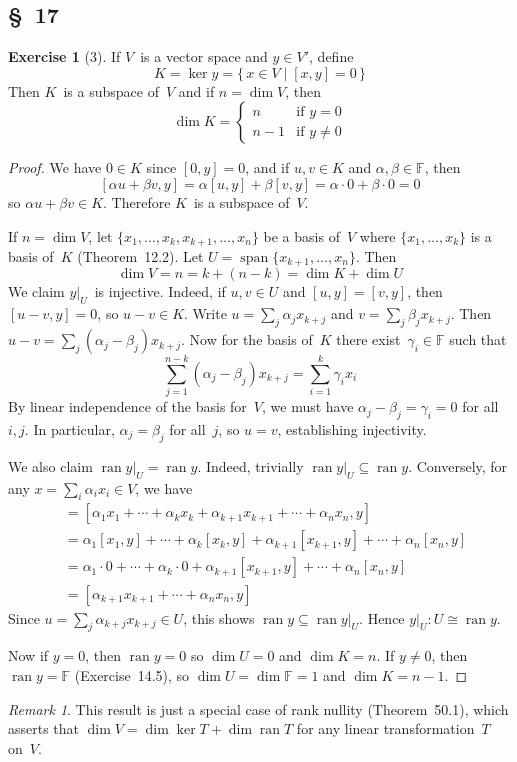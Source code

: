 \documentclass[letterpaper,12pt]{article}
\newcommand{\F}{\mathbb{F}}
\newcommand{\iso}{\cong}
\DeclareMathOperator{\ran}{ran}
\DeclareMathOperator{\spn}{span}
\newcommand{\restrict}[2]{{#1}|_{#2}}
\theoremstyle{definition}
\newtheorem*{exer}{Exercise}
\theoremstyle{remark}
\newtheorem*{rmk}{Remark}
\theoremstyle{direction}
\begin{document}
\subsection*{\S~17}
\begin{exer}[3]
If \(V\)~is a vector space and \(y\in V'\), define
\[K=\ker y=\{\,x\in V\mid [x,y]=0\,\}\]
Then \(K\)~is a subspace of~\(V\) and if \(n=\dim V\), then
\[\dim K=\begin{cases}
n&\text{if }y=0\\
n-1&\text{if }y\ne0
\end{cases}\]
\end{exer}
\begin{proof}
We have \(0\in K\) since \([0,y]=0\), and if \(u,v\in K\) and \(\alpha,\beta\in\F\), then
\[[\alpha u+\beta v,y]=\alpha[u,y]+\beta[v,y]=\alpha\cdot0+\beta\cdot0=0\]
so \(\alpha u+\beta v\in K\). Therefore \(K\)~is a subspace of~\(V\).

If \(n=\dim V\), let \(\{x_1,\ldots,x_k,x_{k+1},\ldots,x_n\}\) be a basis of~\(V\) where \(\{x_1,\ldots,x_k\}\) is a basis of~\(K\) (Theorem~12.2). Let \(U=\spn\{x_{k+1},\ldots,x_n\}\). Then
\[\dim V=n=k+(n-k)=\dim K+\dim U\]
We claim \(\restrict{y}{U}\)~is injective. Indeed, if \(u,v\in U\) and \([u,y]=[v,y]\), then \([u-v,y]=0\), so \(u-v\in K\). Write \(u=\sum_j\alpha_j x_{k+j}\) and \(v=\sum_j\beta_j x_{k+j}\). Then \(u-v=\sum_j(\alpha_j-\beta_j)x_{k+j}\). Now for the basis of~\(K\) there exist~\(\gamma_i\in\F\) such that
\[\sum_{j=1}^{n-k}(\alpha_j-\beta_j)x_{k+j}=\sum_{i=1}^k\gamma_i x_i\]
By linear independence of the basis for~\(V\), we must have \(\alpha_j-\beta_j=\gamma_i=0\) for all~\(i,j\). In particular, \(\alpha_j=\beta_j\) for all~\(j\), so \(u=v\), establishing injectivity.

We also claim \(\ran\restrict{y}{U}=\ran y\). Indeed, trivially \(\ran\restrict{y}{U}\subseteq\ran y\). Conversely, for any \(x=\sum_i\alpha_i x_i\in V\), we have
\begin{align*}
[x,y]&=[\alpha_1x_1+\cdots+\alpha_kx_k+\alpha_{k+1}x_{k+1}+\cdots+\alpha_n x_n,y]\\
	&=\alpha_1[x_1,y]+\cdots+\alpha_k[x_k,y]+\alpha_{k+1}[x_{k+1},y]+\cdots+\alpha_n[x_n,y]\\
	&=\alpha_1\cdot0+\cdots+\alpha_k\cdot0+\alpha_{k+1}[x_{k+1},y]+\cdots+\alpha_n[x_n,y]\\
	&=[\alpha_{k+1}x_{k+1}+\cdots+\alpha_n x_n,y]
\end{align*}
Since \(u=\sum_j\alpha_{k+j}x_{k+j}\in U\), this shows \(\ran y\subseteq\ran\restrict{y}{U}\). Hence \(\restrict{y}{U}:U\iso\ran y\).

Now if \(y=0\), then \(\ran y=0\) so \(\dim U=0\) and \(\dim K=n\). If \(y\ne0\), then \(\ran y=\F\) (Exercise~14.5), so \(\dim U=\dim\F=1\) and \(\dim K=n-1\).
\end{proof}
\begin{rmk}
This result is just a special case of rank nullity (Theorem~50.1), which asserts that \(\dim V=\dim\ker T+\dim\ran T\) for any linear transformation~\(T\) on~\(V\).
\end{rmk}
\end{document}
